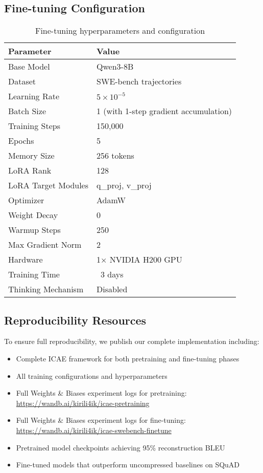 \subsection{Fine-tuning Configuration}

\begin{table}[h]
    \centering
    \small
    \begin{tabular}{ll}
        \toprule
        \textbf{Parameter} & \textbf{Value} \\
        \midrule
        Base Model & Qwen3-8B \\
        Dataset & SWE-bench trajectories \\
        Learning Rate & $5 \times 10^{-5}$ \\
        Batch Size & 1 (with 1-step gradient accumulation) \\
        Training Steps & 150,000 \\
        Epochs & 5 \\
        Memory Size & 256 tokens \\
        LoRA Rank & 128 \\
        LoRA Target Modules & q\_proj, v\_proj \\
        Optimizer & AdamW \\
        Weight Decay & 0 \\
        Warmup Steps & 250 \\
        Max Gradient Norm & 2 \\
        Hardware & 1× NVIDIA H200 GPU \\
        Training Time & ~3 days \\
        Thinking Mechanism & Disabled \\
        \bottomrule
    \end{tabular}
    \caption{Fine-tuning hyperparameters and configuration}
    \label{tab:finetune_config}
\end{table}

\subsection{Reproducibility Resources}

To ensure full reproducibility, we publish our complete implementation including:
\begin{itemize}
    \item Complete ICAE framework for both pretraining and fine-tuning phases
    \item All training configurations and hyperparameters
    \item Full Weights \& Biases experiment logs for pretraining: \url{https://wandb.ai/kirili4ik/icae-pretraining}
    \item Full Weights \& Biases experiment logs for fine-tuning: \url{https://wandb.ai/kirili4ik/icae-swebench-finetune}
    \item Pretrained model checkpoints achieving 95\% reconstruction BLEU
    \item Fine-tuned models that outperform uncompressed baselines on SQuAD
\end{itemize}


